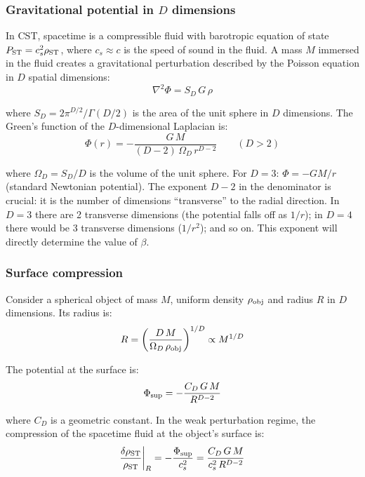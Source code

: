 \documentclass[10pt,a4paper]{article}
\begin{document}
\subsubsection{Gravitational potential in $D$ dimensions}

In CST, spacetime is a compressible fluid with barotropic equation of state $P_{\rm ST} = c_s^2 \rho_{\rm ST}$, where $c_s \approx c$ is the speed of sound in the fluid. A mass $M$ immersed in the fluid creates a gravitational perturbation described by the Poisson equation in $D$ spatial dimensions:
\begin{equation}\label{eq:poisson}
\nabla^2 \Phi = S_D\, G\, \rho
\end{equation}

where $S_D = 2\pi^{D/2}/\Gamma(D/2)$ is the area of the unit sphere in $D$ dimensions. The Green's function of the $D$-dimensional Laplacian is:
\begin{equation}
\Phi(r) = -\frac{G\,M}{(D-2)\,\Omega_D\,r^{D-2}} \qquad (D > 2)
\end{equation}

where $\Omega_D = S_D/D$ is the volume of the unit sphere. For $D = 3$: $\Phi = -GM/r$ (standard Newtonian potential). The exponent $D-2$ in the denominator is crucial: it is the number of dimensions ``transverse'' to the radial direction. In $D = 3$ there are 2 transverse dimensions (the potential falls off as $1/r$); in $D = 4$ there would be 3 transverse dimensions ($1/r^2$); and so on. This exponent will directly determine the value of $\beta$.

\subsubsection{Surface compression}

Consider a spherical object of mass $M$, uniform density $\rho_{\rm obj}$ and radius $R$ in $D$ dimensions. Its radius is:
\begin{equation}
R = \left(\frac{D\,M}{\Omega_D\,\rho_{\rm obj}}\right)^{1/D} \propto M^{1/D}
\end{equation}

The potential at the surface is:
\begin{equation}
\Phi_{\rm sup} = -\frac{C_D\,G\,M}{R^{D-2}}
\end{equation}

where $C_D$ is a geometric constant. In the weak perturbation regime, the compression of the spacetime fluid at the object's surface is:
\begin{equation}\label{eq:compression}
\frac{\delta\rho_{\rm ST}}{\rho_{\rm ST}}\bigg|_{R} = -\frac{\Phi_{\rm sup}}{c_s^2} = \frac{C_D\,G\,M}{c_s^2\,R^{D-2}}
\end{equation}
\end{document}
